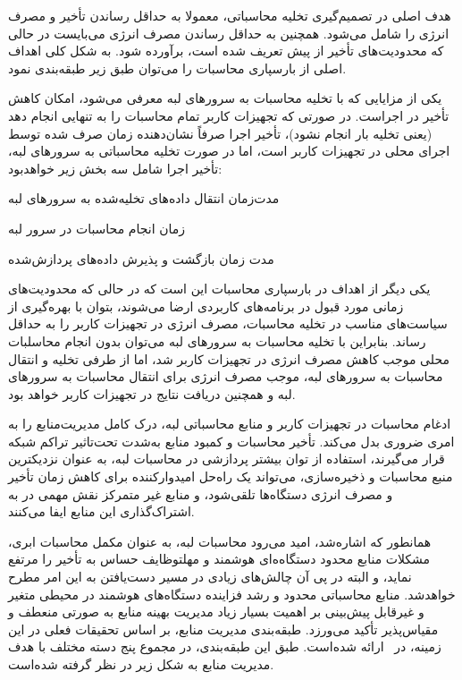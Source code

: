 
هدف اصلی در تصمیم‌گیری تخلیه محاسباتی، معمولا به حداقل رساندن تأخیر و مصرف انرژی را شامل می‌شود. همچنین به حداقل رساندن مصرف انرژی می‌بایست در حالی که محدودیت‌های تأخیر از پیش تعریف شده است، برآورده شود. به شکل کلی اهداف اصلی از بارسپاری محاسبات را می‌توان طبق زیر طبقه‌بندی نمود. 

یکی از مزایایی که با تخلیه محاسبات به سرورهای لبه معرفی می‌شود، امکان کاهش تأخیر در اجراست. در صورتی که تجهیزات کاربر تمام محاسبات را به تنهایی انجام دهد (یعنی تخلیه بار انجام نشود)، تأخیر اجرا صرفاً نشان‌دهنده زمان صرف شده توسط اجرای محلی در  تجهیزات کاربر است، اما در صورت تخلیه محاسباتی به سرورهای لبه، تأخیر اجرا شامل سه بخش زیر خواهدبود:


 مدت‌زمان انتقال داده‌های تخلیه‌شده به سرورهای لبه

 زمان انجام محاسبات در سرور لبه

 مدت زمان بازگشت و پذیرش داده‌های پردازش‌شده 





یکی دیگر از اهداف در بارسپاری محاسبات این است که در حالی که محدودیت‌های زمانی مورد قبول در برنامه‌های کاربردی ارضا می‌شوند، بتوان با بهره‌گیری از سیاست‌های مناسب در تخلیه محاسبات، مصرف انرژی در تجهیزات کاربر را به حداقل رساند. بنابراین با تخلیه محاسبات به سرورهای لبه می‌توان بدون انجام محاسلبات محلی موجب کاهش مصرف انرژی در تجهیزات کاربر شد، اما از طرفی تخلیه و انتقال محاسبات به سرورهای لبه، موجب مصرف انرژی  برای انتقال محاسبات به سرورهای لبه و همچنین دریافت نتایج در تجهیزات کاربر خواهد بود.     





ادغام محاسبات در تجهیزات کاربر و منابع محاسباتی لبه، درک کامل مدیریت‌منابع را به امری ضروری بدل می‌کند. تأخیر محاسبات و کمبود ‌منابع به‌شدت تحت‌تاثیر تراکم شبکه قرار می‌گیرند، استفاده از توان بیشتر پردازشی در محاسبات لبه، به عنوان نزدیکترین منبع محاسبات و ذخیره‌سازی، می‌تواند یک راه‌حل امیدوارکننده برای کاهش زمان تأخیر و مصرف انرژی دستگاه‌ها تلقی‌شود، و منابع غیر متمرکز نقش مهمی در به اشتراک‌گذاری این منابع‌ ایفا می‌کنند. 



همانطور که اشاره‌شد، امید می‌رود محاسبات لبه، به عنوان مکمل محاسبات ابری، مشکلات منابع محدود دستگاه‌ه‌ای هوشمند و مهلتوظایف حساس به تأخیر را مرتفع نماید، و البته در پی آن چالش‌های زیادی در مسیر دست‌یافتن به این امر مطرح خواهدشد. منابع محاسباتی محدود و رشد فزاینده دستگاه‌های هوشمند در محیطی متغیر و غیرقابل پیش‌بینی بر اهمیت بسیار زیاد مدیریت بهینه منابع به صورتی منعطف و مقیاس‌پذیر تأکید می‌ورزد. طبقه‌بندی مدیریت منابع، بر اساس تحقیقات فعلی در این زمینه، در~\cite{tocze2018taxonomy} ارائه شده‌است. طبق این طبقه‌بندی، در مجموع پنج دسته مختلف با هدف مدیریت منابع به شکل زیر در نظر گرفته شده‌است.


